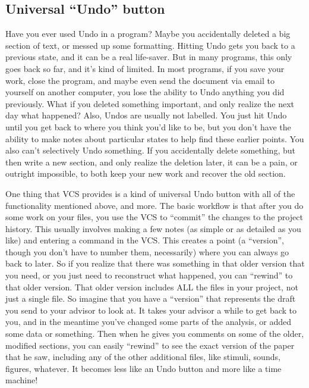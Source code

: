 \documentclass[11pt]{article}
\begin{document}
\subsection{Universal ``Undo'' button}
\label{sec-2-2}

Have you ever used Undo in a program?  Maybe you accidentally deleted a big section of text, or messed up some formatting.  Hitting Undo gets you back to a previous state, and it can be a real life-saver.  But in many programs, this only goes back so far, and it's kind of limited.  In most programs, if you save your work, close the program, and maybe even send the document via email to yourself on another computer, you lose the ability to Undo anything you did previously. What if you deleted something important, and only realize the next day what happened?  Also, Undos are usually not labelled. You just hit Undo until you get back to where you think you'd like to be, but you don't have the ability to make notes about particular states to help find these earlier points.  You also can't selectively Undo something.  If you accidentally delete something, but then write a new section, and only realize the deletion later, it can be a pain, or outright impossible, to both keep your new work and recover the old section.

One thing that VCS provides is a kind of universal Undo button with all of the functionality mentioned above, and more. The basic workflow is that after you do some work on your files, you use the VCS to ``commit'' the changes to the project history. This usually involves making a few notes (as simple or as detailed as you like) and entering a command in the VCS.  This creates a point (a ``version'', though you don't have to number them, necessarily) where you can always go back to later. So if you realize that there was something in that older version that you need, or you just need to reconstruct what happened, you can ``rewind'' to that older version.  That older version includes ALL the files in your project, not just a single file. So imagine that you have a ``version'' that represents the draft you send to your advisor to look at.  It takes your advisor a while to get back to you, and in the meantime you've changed some parts of the analysis, or added some data or something. Then when he gives you comments on some of the older, modified sections, you can easily ``rewind'' to see the exact version of the paper that he saw, including any of the other additional files, like stimuli, sounds, figures, whatever. It becomes less like an Undo button and more like a time machine!
\end{document}
